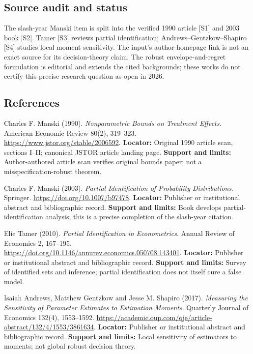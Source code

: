\documentclass[11pt,a4paper]{article}
\begin{document}
\subsection*{Source audit and status}

The slash-year Manski item is split into the verified 1990 article [S1] and 2003 book [S2]. Tamer [S3] reviews partial identification; Andrews--Gentzkow--Shapiro [S4] studies local moment sensitivity. The input's author-homepage link is not an exact source for its decision-theory claim. The robust envelope-and-regret formulation is editorial and extends the cited backgrounds; these works do not certify this precise research question as open in 2026.

\subsection*{References}

\begin{enumerate}[label={[\textnormal{S}\arabic*]},leftmargin=*]

\item Charles F. Manski (1990). \emph{Nonparametric Bounds on Treatment Effects}. American Economic Review 80(2), 319–323. \url{https://www.jstor.org/stable/2006592}. \textbf{Locator:} Original 1990 article scan, sections I–II; canonical JSTOR article landing page. \textbf{Support and limits:} Author-authored article scan verifies original bounds paper; not a misspecification-robust theorem.

\item Charles F. Manski (2003). \emph{Partial Identification of Probability Distributions}. Springer. \url{https://doi.org/10.1007/b97478}. \textbf{Locator:} Publisher or institutional abstract and bibliographic record. \textbf{Support and limits:} Book develops partial-identification analysis; this is a precise completion of the slash-year citation.

\item Elie Tamer (2010). \emph{Partial Identification in Econometrics}. Annual Review of Economics 2, 167–195. \url{https://doi.org/10.1146/annurev.economics.050708.143401}. \textbf{Locator:} Publisher or institutional abstract and bibliographic record. \textbf{Support and limits:} Survey of identified sets and inference; partial identification does not itself cure a false model.

\item Isaiah Andrews, Matthew Gentzkow and Jesse M. Shapiro (2017). \emph{Measuring the Sensitivity of Parameter Estimates to Estimation Moments}. Quarterly Journal of Economics 132(4), 1553–1592. \url{https://academic.oup.com/qje/article-abstract/132/4/1553/3861634}. \textbf{Locator:} Publisher or institutional abstract and bibliographic record. \textbf{Support and limits:} Local sensitivity of estimators to moments; not global robust decision theory.

\end{enumerate}
\end{document}

